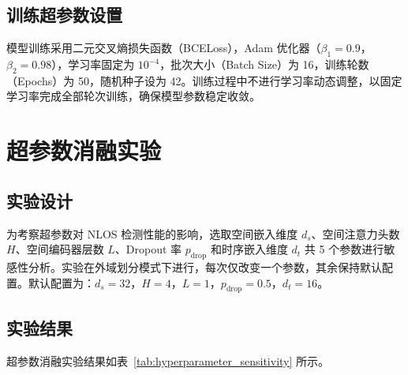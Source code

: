 \subsection{训练超参数设置}

模型训练采用二元交叉熵损失函数（BCELoss），Adam 优化器（$\beta_1=0.9$，$\beta_2=0.98$），学习率固定为 $10^{-4}$，批次大小（Batch Size）为 16，训练轮数（Epochs）为 50，随机种子设为 42。训练过程中不进行学习率动态调整，以固定学习率完成全部轮次训练，确保模型参数稳定收敛。

\section{超参数消融实验}

\subsection{实验设计}

为考察超参数对 NLOS 检测性能的影响，选取空间嵌入维度 $d_s$、空间注意力头数 $H$、空间编码器层数 $L$、Dropout 率 $p_\text{drop}$ 和时序嵌入维度 $d_t$ 共 5 个参数进行敏感性分析。实验在外域划分模式下进行，每次仅改变一个参数，其余保持默认配置。默认配置为：$d_s=32$，$H=4$，$L=1$，$p_\text{drop}=0.5$，$d_t=16$。

\subsection{实验结果}

超参数消融实验结果如表~\ref{tab:hyperparameter_sensitivity} 所示。

